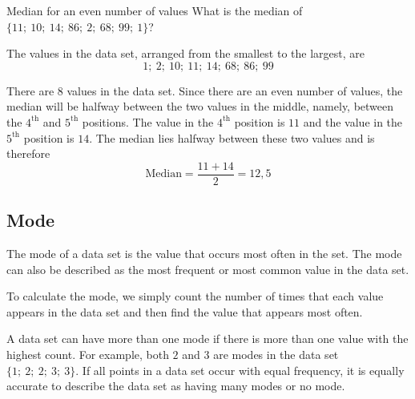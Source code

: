 \begin{wex}{Median for an even number of values}
{What is the median of $\{11;\ 10;\ 14;\ 86;\ 2;\ 68;\ 99;\ 1\}$?}
{

  The values in the data set, arranged from the smallest to the largest, are
  \begin{equation*}
    1;\ 2;\ 10;\ 11;\ 14;\ 68;\ 86;\ 99
  \end{equation*}


  There are $8$ values in the data set. Since there are an even number
  of values, the median will be halfway between the two values in the
  middle, namely, between the $4^{\mathrm{th}}$ and $5^{\mathrm{th}}$ positions. The value in the
  $4^{\mathrm{th}}$ position is $11$ and the value in the $5^{\mathrm{th}}$ position is
  $14$. The median lies halfway between these two values and is
  therefore
  \begin{equation*}
    \mbox{Median} = \frac{11+14}{2} = 12,5
  \end{equation*}
}
\end{wex}

\subsection{Mode}
{The mode of a data set is the value that occurs most often in the
  set. The mode can also be described as the most frequent or most
  common value in the data set.}

To calculate the mode, we simply count the number of times that each
value appears in the data set and then find the value that appears
most often.

A data set can have more than one mode if there is more than one value
with the highest count. For example, both $2$ and $3$ are modes in the
data set $\{1;\ 2;\ 2;\ 3;\ 3\}$. If all points in a data set occur
with equal frequency, it is equally accurate to describe the data set
as having many modes or no mode.

